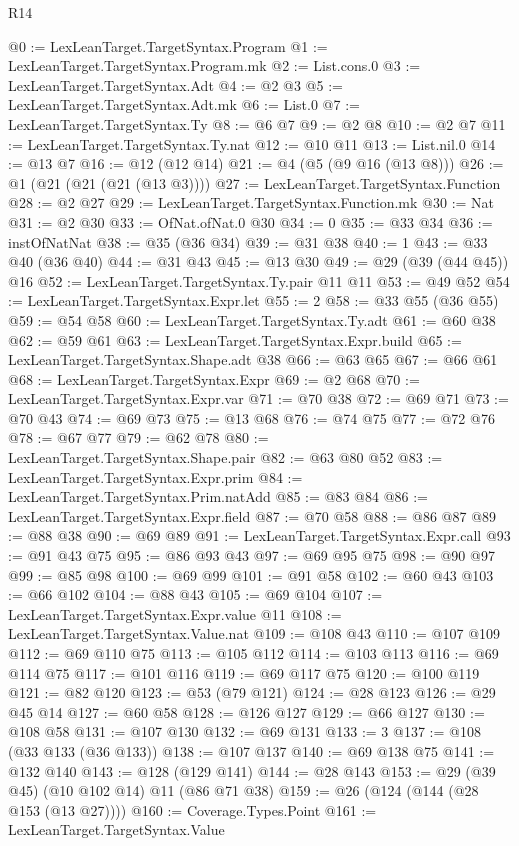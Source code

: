 \begin{lexlean}{R14}
\begin{coremodule}
@0 := LexLeanTarget.TargetSyntax.Program
@1 := LexLeanTarget.TargetSyntax.Program.mk
@2 := List.cons.{0}
@3 := LexLeanTarget.TargetSyntax.Adt
@4 := @2 @3
@5 := LexLeanTarget.TargetSyntax.Adt.mk
@6 := List.{0}
@7 := LexLeanTarget.TargetSyntax.Ty
@8 := @6 @7
@9 := @2 @8
@10 := @2 @7
@11 := LexLeanTarget.TargetSyntax.Ty.nat
@12 := @10 @11
@13 := List.nil.{0}
@14 := @13 @7
@16 := @12 (@12 @14)
@21 := @4 (@5 (@9 @16 (@13 @8)))
@26 := @1 (@21 (@21 (@21 (@13 @3))))
@27 := LexLeanTarget.TargetSyntax.Function
@28 := @2 @27
@29 := LexLeanTarget.TargetSyntax.Function.mk
@30 := Nat
@31 := @2 @30
@33 := OfNat.ofNat.{0} @30
@34 := 0
@35 := @33 @34
@36 := instOfNatNat
@38 := @35 (@36 @34)
@39 := @31 @38
@40 := 1
@43 := @33 @40 (@36 @40)
@44 := @31 @43
@45 := @13 @30
@49 := @29 (@39 (@44 @45)) @16
@52 := LexLeanTarget.TargetSyntax.Ty.pair @11 @11
@53 := @49 @52
@54 := LexLeanTarget.TargetSyntax.Expr.let
@55 := 2
@58 := @33 @55 (@36 @55)
@59 := @54 @58
@60 := LexLeanTarget.TargetSyntax.Ty.adt
@61 := @60 @38
@62 := @59 @61
@63 := LexLeanTarget.TargetSyntax.Expr.build
@65 := LexLeanTarget.TargetSyntax.Shape.adt @38
@66 := @63 @65
@67 := @66 @61
@68 := LexLeanTarget.TargetSyntax.Expr
@69 := @2 @68
@70 := LexLeanTarget.TargetSyntax.Expr.var
@71 := @70 @38
@72 := @69 @71
@73 := @70 @43
@74 := @69 @73
@75 := @13 @68
@76 := @74 @75
@77 := @72 @76
@78 := @67 @77
@79 := @62 @78
@80 := LexLeanTarget.TargetSyntax.Shape.pair
@82 := @63 @80 @52
@83 := LexLeanTarget.TargetSyntax.Expr.prim
@84 := LexLeanTarget.TargetSyntax.Prim.natAdd
@85 := @83 @84
@86 := LexLeanTarget.TargetSyntax.Expr.field
@87 := @70 @58
@88 := @86 @87
@89 := @88 @38
@90 := @69 @89
@91 := LexLeanTarget.TargetSyntax.Expr.call
@93 := @91 @43 @75
@95 := @86 @93 @43
@97 := @69 @95 @75
@98 := @90 @97
@99 := @85 @98
@100 := @69 @99
@101 := @91 @58
@102 := @60 @43
@103 := @66 @102
@104 := @88 @43
@105 := @69 @104
@107 := LexLeanTarget.TargetSyntax.Expr.value @11
@108 := LexLeanTarget.TargetSyntax.Value.nat
@109 := @108 @43
@110 := @107 @109
@112 := @69 @110 @75
@113 := @105 @112
@114 := @103 @113
@116 := @69 @114 @75
@117 := @101 @116
@119 := @69 @117 @75
@120 := @100 @119
@121 := @82 @120
@123 := @53 (@79 @121)
@124 := @28 @123
@126 := @29 @45 @14
@127 := @60 @58
@128 := @126 @127
@129 := @66 @127
@130 := @108 @58
@131 := @107 @130
@132 := @69 @131
@133 := 3
@137 := @108 (@33 @133 (@36 @133))
@138 := @107 @137
@140 := @69 @138 @75
@141 := @132 @140
@143 := @128 (@129 @141)
@144 := @28 @143
@153 := @29 (@39 @45) (@10 @102 @14) @11 (@86 @71 @38)
@159 := @26 (@124 (@144 (@28 @153 (@13 @27))))
@160 := Coverage.Types.Point
@161 := LexLeanTarget.TargetSyntax.Value

\end{coremodule}
\end{lexlean}

